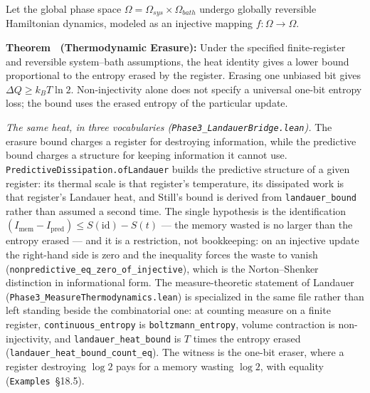 \documentclass{article}
\begin{document}
Let the global phase space $\Omega = \Omega_{sys} \times \Omega_{bath}$ undergo globally reversible Hamiltonian dynamics, modeled as an injective mapping $f: \Omega \to \Omega$.

\label{thm:supp-erasure}
\textbf{Theorem \thesuppresult\ (Thermodynamic Erasure):} Under the specified finite-register and reversible system--bath assumptions, the heat identity gives a lower bound proportional to the entropy erased by the register. Erasing one unbiased bit gives $\Delta Q\geq k_BT\ln2$. Non-injectivity alone does not specify a universal one-bit entropy loss; the bound uses the erased entropy of the particular update.

\textit{The same heat, in three vocabularies (\nolinkurl{Phase3_LandauerBridge.lean}).} The erasure bound charges a register for destroying information, while the predictive bound charges a structure for keeping information it cannot use. \nolinkurl{PredictiveDissipation.ofLandauer} builds the predictive structure of a given register: its thermal scale is that register's temperature, its dissipated work is that register's Landauer heat, and Still's bound is derived from \nolinkurl{landauer_bound} rather than assumed a second time. The single hypothesis is the identification $\left(I_{\mathrm{mem}} - I_{\mathrm{pred}}\right) \le S(\mathrm{id}) - S(t)$ --- the memory wasted is no larger than the entropy erased --- and it is a restriction, not bookkeeping: on an injective update the right-hand side is zero and the inequality forces the waste to vanish (\nolinkurl{nonpredictive_eq_zero_of_injective}), which is the Norton--Shenker distinction in informational form. The measure-theoretic statement of Landauer (\nolinkurl{Phase3_MeasureThermodynamics.lean}) is specialized in the same file rather than left standing beside the combinatorial one: at counting measure on a finite register, \nolinkurl{continuous_entropy} is \nolinkurl{boltzmann_entropy}, volume contraction is non-injectivity, and \nolinkurl{landauer_heat_bound} is $T$ times the entropy erased (\nolinkurl{landauer_heat_bound_count_eq}). The witness is the one-bit eraser, where a register destroying $\log 2$ pays for a memory wasting $\log 2$, with equality (\texttt{Examples}~\S18.5).
\end{document}
